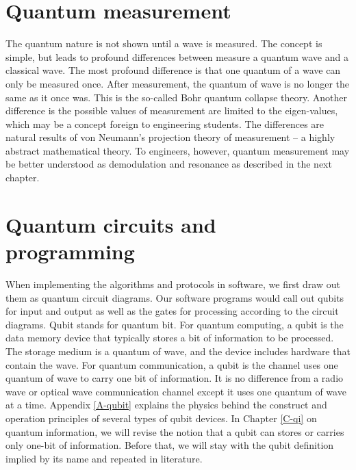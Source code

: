 \documentclass{book}
\begin{document}
\section{Quantum measurement}
The quantum nature is not shown until a wave is measured. The concept is simple, but leads to profound differences between measure a quantum wave and a classical wave. The most profound difference is that one quantum of a wave can only be measured once. After measurement, the quantum of wave is no longer the same as it once was. This is the so-called Bohr quantum collapse theory. Another difference is the possible values of measurement are limited to the eigen-values, which may be a concept foreign to engineering students. The differences are natural results of von Neumann's projection theory of measurement -- a highly abstract mathematical theory. To engineers, however, quantum measurement may be better understood as demodulation and resonance as described in the next chapter. 

\section{Quantum circuits and programming}

When implementing the algorithms and protocols in software, we first draw out them as quantum circuit diagrams. Our software programs would call out qubits for input and output as well as the gates for processing according to the circuit diagrams. Qubit stands for quantum bit. For quantum computing, a qubit is the data memory device that typically stores a bit of information to be processed. The storage medium is a quantum of wave, and the device includes hardware that contain the wave. For quantum communication, a qubit is the channel uses one quantum of wave to carry one bit of information. It is no difference from a radio wave or optical wave communication channel except it uses one quantum of wave at a time. Appendix \ref{A-qubit} explains the physics behind the construct and operation principles of several types of qubit devices. In Chapter \ref{C-qi} on quantum information, we will revise the notion that a qubit can stores or carries only one-bit of information. Before that, we will stay with the qubit definition implied by its name and repeated in literature.
\end{document}
